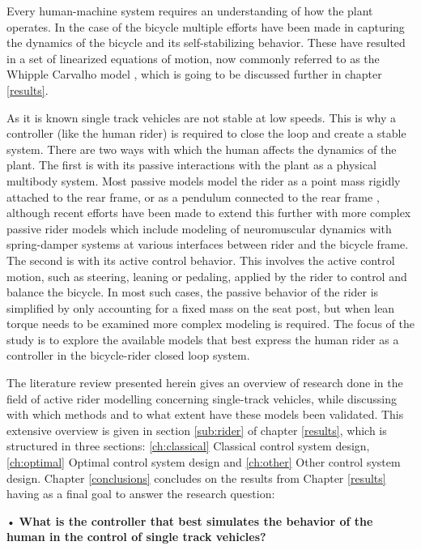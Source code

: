 Every human-machine system requires an understanding of how the plant operates. In the case of the bicycle multiple efforts have been made in capturing the dynamics of the bicycle and its  self-stabilizing behavior. These have resulted in a set of linearized equations of motion, now  commonly referred to as the Whipple Carvalho model \cite{meijaard2007linearized}, which is going to be discussed further in chapter \ref{results}.\par
As it is known single track vehicles are not stable at low speeds. This is why a controller (like the human rider) is required to close the loop and create a stable system. There are two ways with which the human affects the dynamics of the plant. The first is with its passive interactions with the plant as a physical multibody system. Most passive models model the rider as a point mass rigidly attached to the rear frame, or as a pendulum connected to the rear frame \cite{eaton1975man}, although recent efforts have been made to extend this further with more complex passive rider models which include modeling of neuromuscular dynamics with spring-damper systems at various interfaces between rider and the bicycle frame\cite{dialynas2019}. The second is with its active control behavior. This involves the active control motion, such as steering, leaning or pedaling, applied by the rider to control and balance the bicycle. In most such cases, the passive behavior  of the rider is simplified by only  accounting for a fixed mass on the seat post, but when lean torque needs to be examined more complex modeling is required. The focus of the study is to explore the available models that best express the human rider as a controller in the bicycle-rider closed loop system.\par
The literature review presented herein gives an overview of research done in the field of active rider modelling  concerning single-track vehicles, while discussing with which methods and to what extent have these models been validated. This extensive overview is given in section \ref{sub:rider} of chapter \ref{results}, which is structured in three sections: \ref{ch:classical} Classical control system design, \ref{ch:optimal} Optimal control system design and \ref{ch:other} Other control system design. Chapter \ref{conclusions} concludes on the results from Chapter \ref{results} having as a final goal to answer the research question:
\par
• \textbf{What is the controller that best simulates the behavior of the human in the control of single track vehicles?}

